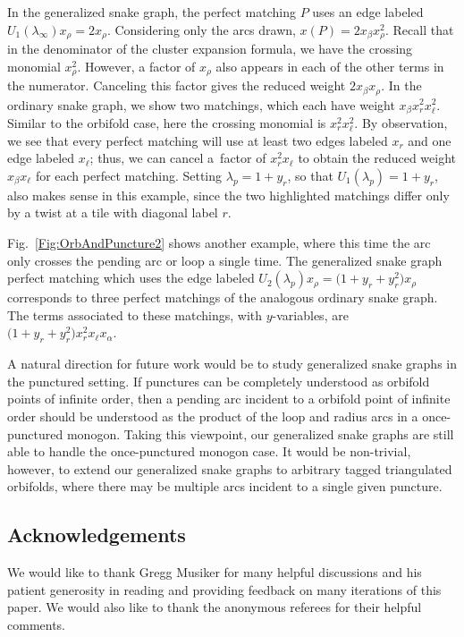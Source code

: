 \documentclass[pdftex]{sigma}%
\numberwithin{equation}{section}
\begin{document}
In the generalized snake graph, the perfect matching $P$ uses an edge labeled $U_1(\lambda_\infty)x_\rho = 2x_\rho$. Considering only the arcs drawn, $x(P) = 2 x_\beta x_\rho^2$. Recall that in the denominator of the cluster expansion formula, we have the crossing monomial $x_\rho^2$. However, a factor of $x_\rho$ also appears in each of the other terms in the numerator. Canceling this factor gives the reduced weight $2 x_\beta x_\rho$. In the ordinary snake graph, we show two matchings, which each have weight $x_\beta x_r^2 x_\ell^2$. Similar to the orbifold case, here the crossing monomial is $x_r^2 x_\ell^2$.
By observation, we see that every perfect matching will use at least two edges labeled $x_r$ and one edge labeled $x_\ell$; thus, we can cancel a~factor of $x_r^2x_\ell$ to obtain the reduced weight $x_\beta x_\ell$ for each perfect matching. Setting $\lambda_p = 1 + y_r$, so that $U_1(\lambda_p) = 1 + y_r$, also makes sense in this example, since the two highlighted matchings differ only by a twist at a tile with diagonal label $r$.

Fig.~\ref{Fig:OrbAndPuncture2} shows another example, where this time the arc only crosses the pending arc or loop a single time. The generalized snake graph perfect matching which uses the edge labeled $U_2(\lambda_p) x_\rho = \big(1 + y_r + y_r^2\big) x_\rho$ corresponds to three perfect matchings of the analogous ordinary snake graph. The terms associated to these matchings, with $y$-variables, are $\big(1 + y_r + y_r^2\big) x_r^2 x_\ell x_\alpha$.

A natural direction for future work would be to study generalized snake graphs in the punctured setting. If punctures can be completely understood as orbifold points of infinite order, then a pending arc incident to a orbifold point of infinite order should be understood as the product of the loop and radius arcs in a once-punctured monogon. Taking this viewpoint, our generalized snake graphs are still able to handle the once-punctured monogon case. It would be non-trivial, however, to extend our generalized snake graphs to arbitrary tagged triangulated orbifolds, where there may be multiple arcs incident to a single given puncture.

\subsection*{Acknowledgements} We would like to thank Gregg Musiker for many helpful discussions and his patient generosity in reading and providing feedback on many iterations of this paper. We would also like to thank the anonymous referees for their helpful comments.
\end{document}
